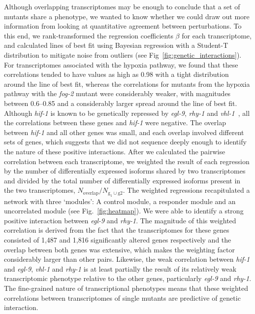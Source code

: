\documentclass[9pt,twocolumn,twoside]{pnas-new}
\newcommand{\egl}{\emph{egl-9}}
\newcommand{\rhy}{\emph{rhy-1}}
\newcommand{\vhl}{\emph{vhl-1}}
\newcommand{\hif}{\emph{hif-1}}
\newcommand{\fog}{\emph{fog-2}}
\newcommand{\egln}{1,487}
\newcommand{\rhyn}{1,816}
\begin{document}
Although overlapping transcriptomes may be enough to conclude that a set of mutants
share a phenotype, we wanted to know whether we could draw out more information from
looking at quantitative agreement between perturbations. To this end, we rank-transformed
the regression coefficients $\beta$ for each transcriptome, and calculated lines
of best fit using Bayesian regression with a Student-T distribution to mitigate
noise from outliers (see Fig~\ref{fig:genetic_interactions}). For transcriptomes
associated with the hypoxia pathway, we found that these correlations tended to have
values as high as 0.98 with a tight distribution around the line of best fit,
whereas the correlations for mutants from the hypoxia pathway
with the \fog{} mutant were considerably weaker, with magnitudes between
0.6--0.85 and a considerably larger spread around the line of best fit.
Although \hif{} is known to be genetically repressed by \egl{}, \rhy{} and
\vhl{}~\cite{Epstein2001}, all the correlations
between these genes and \hif{} were negative. The overlap between
\hif{} and all other genes was small, and each overlap involved
different sets of genes, which suggests that we did not sequence deeply enough
to identify the nature of these positive interactions.
After we calculated the pairwise correlation between each transcriptome,
we weighted the result of each regression by the
number of differentially expressed isoforms shared by two transcriptomes and
divided by the total number of differentially expressed isoforms present in the
two transcriptomes, $N_\mathrm{overlap}/N_{\mathrm{g_1} \cup \mathrm{g2}}$.
The weighted regressions recapitulated a network with three `modules': A control
module, a responder module and an uncorrelated module (see Fig.~\ref{fig:heatmap}).
We were able to identify a strong positive interaction between \egl{} and \rhy{}.
The magnitude of this weighted correlation is derived from the fact that the
transcriptomes for these genes consisted of \egln{} and \rhyn{} significantly
altered genes respectively and the overlap between both genes was
extensive, which makes the weighting factor considerably larger than other pairs.
Likewise, the weak correlation between \hif{} and \egl{}, \vhl{} and \rhy{} is at
least partially the result of its relatively weak transcriptomic phenotype relative
to the other genes, particularly \egl{} and \rhy{}. 
The fine-grained nature of transcriptional phenotypes means that these weighted
correlations between transcriptomes of single mutants are predictive of genetic
interaction.
\end{document}
